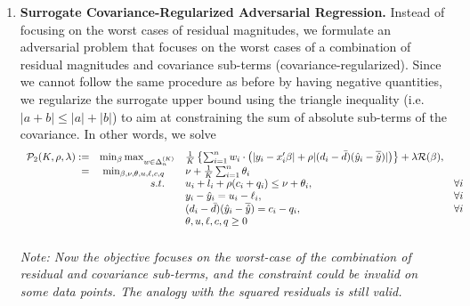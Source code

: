 \documentclass[11pt]{article}
\theoremstyle{plain}
\theoremstyle{definition}
\newcommand{\1}{\mathbf{1}}
\renewcommand{\P}{\mathcal{P}}
\begin{document}
\begin{enumerate}
\textit{Note: The objective only focuses on the worst-case residual samples, but the constraint is over the whole sample of data points. The analogy with the squared residuals is also valid.} 
\item \textbf{Surrogate Covariance-Regularized Adversarial Regression.} Instead of focusing on the worst cases of residual magnitudes, we formulate an adversarial problem that focuses on the worst cases of a combination of residual magnitudes and covariance sub-terms (covariance-regularized). Since we cannot follow the same procedure as before by having negative quantities, we regularize the surrogate upper bound using the triangle inequality (i.e. $|a+b|\leq |a|+|b|$) to aim at constraining the sum of absolute sub-terms of the covariance. In other words, we solve 
{\everymath{\displaystyle}
\begin{align*}
    \begin{array}{rrll}
    \P_2(K, \rho, \lambda):=&  \min_{\beta} \max_{w\in \Delta_{n}^{(K)}} &\frac{1}{K} \left\{ \sum_{i=1}^n w_i \cdot\left(|y_i - x_i'\beta| + \rho|(d_i - \Bar{d})(\hat{y}_i - \overline{\hat{y}})| \right)\right\} + \lambda \mathcal{R}(\beta), & \\
    =& \min_{\beta, \nu, \theta, u,\ell,c,q} \quad & \nu + \frac{1}{K}\sum_{i=1}^n \theta_i \\
    & s.t. \quad  & u_i + l_i + \rho (c_i + q_i) \leq \nu + \theta_i,& \forall i  \\
    &   & y_i - \hat{y}_i = u_i - \ell_i, & \forall i  \\
    && (d_i - \Bar{d})(\hat{y}_i - \overline{\hat{y}}) = c_i - q_i, & \forall i\\
   &&  \theta, u, \ell, c, q \geq 0 \\
   & & 
    \end{array}
\end{align*}}
\textit{Note: Now the objective focuses on the worst-case of the combination of residual and covariance sub-terms, and the constraint could be invalid on some data points. The analogy with the squared residuals is still valid.} 


\end{enumerate}
\end{document}
